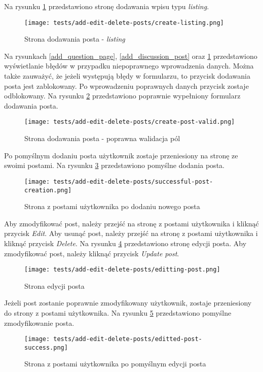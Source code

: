 Na rysunku \ref{add_listing_post} przedstawiono stronę dodawania wpisu typu \textit{listing}.
\begin{figure}[H]
  \centering
  \texttt{[image: tests/add-edit-delete-posts/create-listing.png]}
  \caption{Strona dodawania posta - \textit{listing}}
  \label{add_listing_post}
\end{figure}
Na rysunkach \ref{add_question_page}, \ref{add_discussion_post} oraz \ref{add_listing_post} przedstawiono wyświetlanie błędów w przypadku niepoprawnego wprowadzenia danych. Można także zauważyć, że jeżeli występują błędy w formularzu, to przycisk dodawania posta jest zablokowany. Po wprowadzeniu poprawnych danych przycisk zostaje odblokowany. Na rysunku \ref{add_valid_post} przedstawiono poprawnie wypełniony formularz dodawania posta.
\begin{figure}[H]
  \centering
  \texttt{[image: tests/add-edit-delete-posts/create-post-valid.png]}
  \caption{Strona dodawania posta - poprawna walidacja pól}
  \label{add_valid_post}
\end{figure}
Po pomyślnym dodaniu posta użytkownik zostaje przeniesiony na stronę ze swoimi postami. Na rysunku \ref{add_post_success} przedstawiono pomyślne dodania posta.
\begin{figure}[H]
  \centering
  \texttt{[image: tests/add-edit-delete-posts/successful-post-creation.png]}
  \caption{Strona z postami użytkownika po dodaniu nowego posta}
  \label{add_post_success}
\end{figure}
Aby zmodyfikować post, należy przejść na stronę z postami użytkownika i kliknąć przycisk \textit{Edit}. Aby usunąć post, należy przejść na stronę z postami użytkownika i kliknąć przycisk \textit{Delete}. Na rysunku \ref{edit_post} przedstawiono stronę edycji posta. Aby zmodyfikować post, należy kliknąć przycisk \textit{Update post}. 
\begin{figure}[H]
  \centering
  \texttt{[image: tests/add-edit-delete-posts/editting-post.png]}
  \caption{Strona edycji posta}
  \label{edit_post}
\end{figure}
Jeżeli post zostanie poprawnie zmodyfikowany użytkownik, zostaje przeniesiony do strony z postami użytkownika. Na rysunku \ref{edit_post_success} przedstawiono pomyślne zmodyfikowanie posta.
\begin{figure}[H]
  \centering
  \texttt{[image: tests/add-edit-delete-posts/editted-post-success.png]}
  \caption{Strona z postami użytkownika po pomyślnym edycji posta}
  \label{edit_post_success}
\end{figure}

